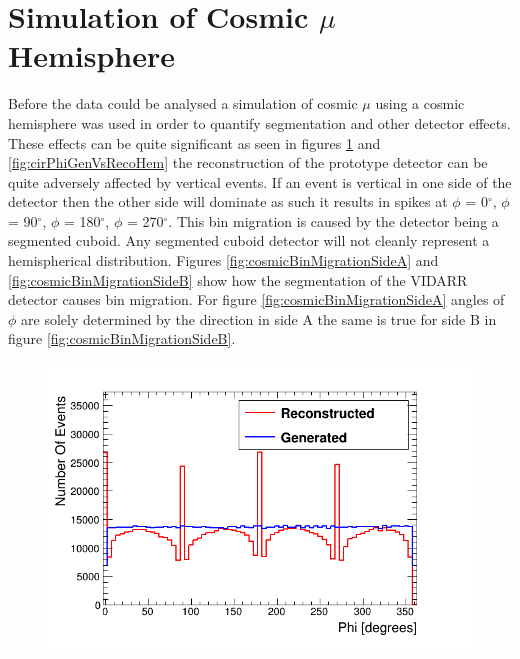 \section{Simulation of Cosmic $\mu$ Hemisphere}\label{sec:SimulationOfCosmics}
Before the data could be analysed a simulation of cosmic $\mu$ using a cosmic hemisphere was used in order to quantify segmentation and other detector effects. These effects can be quite significant as seen in figures \ref{fig:phiGenVsRecoHem} and \ref{fig:cirPhiGenVsRecoHem} the reconstruction of the prototype detector can be quite adversely affected by vertical events. If an event is vertical in one side of the detector then the other side will dominate as such it results in spikes at $\phi$ = 0$^\circ$, $\phi$ = 90$^\circ$, $\phi$ = 180$^\circ$, $\phi$ = 270$^\circ$. This bin migration is caused by the detector being a segmented cuboid. Any segmented cuboid detector will not cleanly represent a hemispherical distribution. Figures \ref{fig:cosmicBinMigrationSideA} and \ref{fig:cosmicBinMigrationSideB} show how the segmentation of the VIDARR detector causes bin migration. For figure \ref{fig:cosmicBinMigrationSideA} angles of $\phi$ are solely determined by the direction in side A the same is true for side B in figure \ref{fig:cosmicBinMigrationSideB}. 

\begin{figure}[htbp]
 \centering
 \includegraphics[width=0.8\linewidth]{Chapter5/Figs/Raster/hemispherePhiCompare.png}
 \label{fig:phiGenVsRecoHem}
\end{figure}

